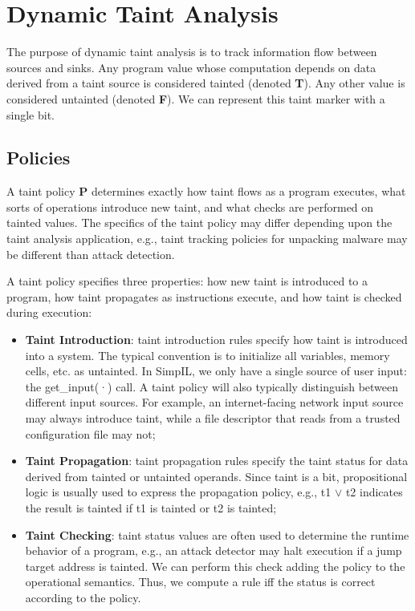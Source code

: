 \section{Dynamic Taint Analysis}
The purpose of dynamic taint analysis is to track information flow between sources and sinks. Any program value whose computation depends on data derived from a taint source is considered tainted (denoted \textbf{T}). Any other value is considered untainted (denoted \textbf{F}). We can represent this taint marker with a single bit.

\subsection{Policies}
A taint policy \textbf{P} determines exactly how taint flows as a program executes, what sorts of operations introduce new taint, and what checks are performed on tainted values. The specifics of the taint policy may differ depending upon the taint analysis application, e.g., taint tracking policies for unpacking malware may be different than attack detection.

A taint policy specifies three properties: how new taint is introduced to a program, how taint propagates as instructions execute, and how taint is checked during execution:
\begin{itemize}
	\item \textbf{Taint Introduction}: taint introduction rules specify how taint is introduced into a system. The typical convention is to initialize all variables, memory cells, etc. as untainted. In SimpIL, we only have a single source of user input: the get\_input(·) call. A taint policy will also typically distinguish between different input sources. For example, an internet-facing network input source may always introduce taint, while a file descriptor that reads from a trusted configuration file may not;
	\item \textbf{Taint Propagation}: taint propagation rules specify the taint status for data derived from tainted or untainted operands. Since taint is a bit, propositional logic is usually used to express the propagation policy, e.g., t1 $\lor$ t2 indicates the result is tainted if t1 is tainted or t2 is tainted;
	\item \textbf{Taint Checking}: taint status values are often used to determine the runtime behavior of a program, e.g., an attack detector may halt execution if a jump target address is tainted. We can perform this check adding the policy to the operational semantics. Thus, we compute a rule iff the status is correct according to the policy.
\end{itemize}

